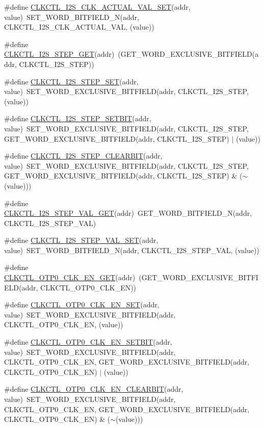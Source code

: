 \begin{DoxyCompactItemize}
\item 
\#define \hyperlink{a00544_a8190ea7430e40f25ab3dc47190a5a6a9}{CLKCTL\_\-I2S\_\-CLK\_\-ACTUAL\_\-VAL\_\-SET}(addr, value)~SET\_\-WORD\_\-BITFIELD\_\-N(addr, CLKCTL\_\-I2S\_\-CLK\_\-ACTUAL\_\-VAL, (value))
\item 
\#define \hyperlink{a00544_a292fea5a916d57fa7b3373434a6b5613}{CLKCTL\_\-I2S\_\-STEP\_\-GET}(addr)~(GET\_\-WORD\_\-EXCLUSIVE\_\-BITFIELD(addr, CLKCTL\_\-I2S\_\-STEP))
\item 
\#define \hyperlink{a00544_a2bbfca2731fe129698c262161d7dcad4}{CLKCTL\_\-I2S\_\-STEP\_\-SET}(addr, value)~SET\_\-WORD\_\-EXCLUSIVE\_\-BITFIELD(addr, CLKCTL\_\-I2S\_\-STEP, (value))
\item 
\#define \hyperlink{a00544_ac9dcf8e43c35a267ef65825b97440cfa}{CLKCTL\_\-I2S\_\-STEP\_\-SETBIT}(addr, value)~SET\_\-WORD\_\-EXCLUSIVE\_\-BITFIELD(addr, CLKCTL\_\-I2S\_\-STEP, GET\_\-WORD\_\-EXCLUSIVE\_\-BITFIELD(addr, CLKCTL\_\-I2S\_\-STEP) $|$ (value))
\item 
\#define \hyperlink{a00544_a3a4f10b8164134f0ce7b45b08d7fb255}{CLKCTL\_\-I2S\_\-STEP\_\-CLEARBIT}(addr, value)~SET\_\-WORD\_\-EXCLUSIVE\_\-BITFIELD(addr, CLKCTL\_\-I2S\_\-STEP, GET\_\-WORD\_\-EXCLUSIVE\_\-BITFIELD(addr, CLKCTL\_\-I2S\_\-STEP) \& ($\sim$(value)))
\item 
\#define \hyperlink{a00544_a3fa698230e741606182bf2135c720a69}{CLKCTL\_\-I2S\_\-STEP\_\-VAL\_\-GET}(addr)~GET\_\-WORD\_\-BITFIELD\_\-N(addr, CLKCTL\_\-I2S\_\-STEP\_\-VAL)
\item 
\#define \hyperlink{a00544_a6cf45ea5ddf6e791e2e5026ca3e66786}{CLKCTL\_\-I2S\_\-STEP\_\-VAL\_\-SET}(addr, value)~SET\_\-WORD\_\-BITFIELD\_\-N(addr, CLKCTL\_\-I2S\_\-STEP\_\-VAL, (value))
\item 
\#define \hyperlink{a00544_ad1d4a4db791c69a00713cbab9974fe2b}{CLKCTL\_\-OTP0\_\-CLK\_\-EN\_\-GET}(addr)~(GET\_\-WORD\_\-EXCLUSIVE\_\-BITFIELD(addr, CLKCTL\_\-OTP0\_\-CLK\_\-EN))
\item 
\#define \hyperlink{a00544_aaf1034cd13c2db6b3a136d36a7beeea0}{CLKCTL\_\-OTP0\_\-CLK\_\-EN\_\-SET}(addr, value)~SET\_\-WORD\_\-EXCLUSIVE\_\-BITFIELD(addr, CLKCTL\_\-OTP0\_\-CLK\_\-EN, (value))
\item 
\#define \hyperlink{a00544_a60df9683ffc3ba2f966edb6eead1ca08}{CLKCTL\_\-OTP0\_\-CLK\_\-EN\_\-SETBIT}(addr, value)~SET\_\-WORD\_\-EXCLUSIVE\_\-BITFIELD(addr, CLKCTL\_\-OTP0\_\-CLK\_\-EN, GET\_\-WORD\_\-EXCLUSIVE\_\-BITFIELD(addr, CLKCTL\_\-OTP0\_\-CLK\_\-EN) $|$ (value))
\item 
\#define \hyperlink{a00544_a3ae1115435e9d11ec64c83f3e39d0d11}{CLKCTL\_\-OTP0\_\-CLK\_\-EN\_\-CLEARBIT}(addr, value)~SET\_\-WORD\_\-EXCLUSIVE\_\-BITFIELD(addr, CLKCTL\_\-OTP0\_\-CLK\_\-EN, GET\_\-WORD\_\-EXCLUSIVE\_\-BITFIELD(addr, CLKCTL\_\-OTP0\_\-CLK\_\-EN) \& ($\sim$(value)))

\end{DoxyCompactItemize}
